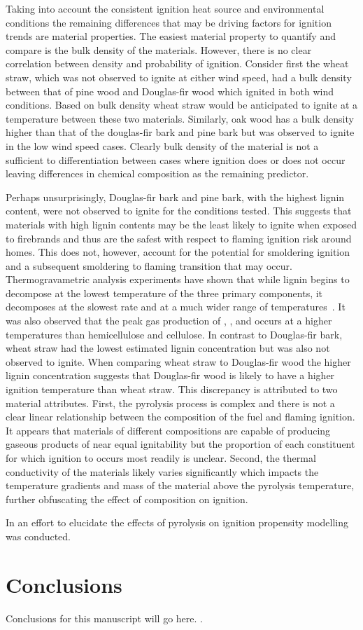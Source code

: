     Taking into account the consistent ignition heat source and environmental conditions the remaining differences that may be driving factors for ignition trends are material properties. 
    The easiest material property to quantify and compare is the bulk density of the materials. However, there is no clear correlation between density and probability of ignition. Consider first the wheat straw, which was not observed to ignite at either wind speed, had a bulk density between that of pine wood and Douglas-fir wood which ignited in both wind conditions. Based on bulk density wheat straw would be anticipated to ignite at a temperature between these two materials. Similarly, oak wood has a bulk density higher than that of the douglas-fir bark and pine bark but was observed to ignite in the low wind speed cases. Clearly bulk density of the material is not a sufficient to differentiation between cases where ignition does or does not occur leaving differences in chemical composition as the remaining predictor. 
    
    Perhaps unsurprisingly, Douglas-fir bark and pine bark, with the highest lignin content, were not observed to ignite for the conditions tested. This suggests that materials with high lignin contents may be the least likely to ignite when exposed to firebrands and thus are the safest with respect to flaming ignition risk around homes. This does not, however, account for the potential for smoldering ignition and a subsequent smoldering to flaming transition that may occur. Thermogravametric analysis experiments have shown that while lignin begins to decompose at the lowest temperature of the three primary components, it decomposes at the slowest rate and at a much wider range of temperatures~\cite{Yang2007a}. It was also observed that the peak gas production of , , and  occurs at a higher temperatures than hemicellulose and cellulose. In contrast to Douglas-fir bark, wheat straw had the lowest estimated lignin concentration but was also not observed to ignite. When comparing wheat straw to Douglas-fir wood the higher lignin concentration suggests that Douglas-fir wood is likely to have a higher ignition temperature than wheat straw. This discrepancy is attributed to two material attributes. First, the pyrolysis process is complex and there is not a clear linear relationship between the composition of the fuel and flaming ignition. It appears that materials of different compositions are capable of producing gaseous products of near equal ignitability but the proportion of each constituent for which ignition to occurs most readily is unclear. Second, the thermal conductivity of the materials likely varies significantly which impacts the temperature gradients and mass of the material above the pyrolysis temperature, further obfuscating the effect of composition on ignition. 
    
    In an effort to elucidate the effects of pyrolysis on ignition propensity modelling was conducted. 
    
    \section{Conclusions}
    \label{sec:conclusions3}
    Conclusions for this manuscript will go here.
    \cite{MacLean1941}.
    

    
   